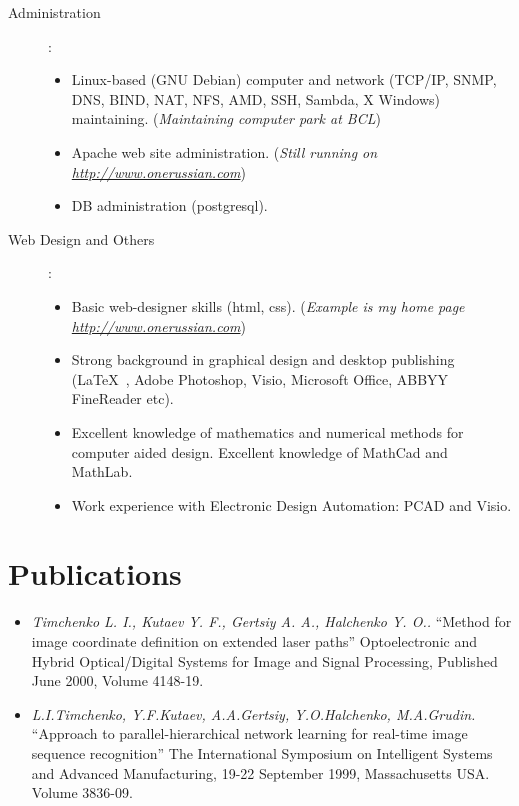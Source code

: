 \documentclass[10pt,overlapped,line]{res}
\newcommand{\wdescription}[1]{({\small \textit{#1}})}
\newcommand{\mtitle}[1]{``#1''}
\newcommand{\mauthors}[1]{ \textit{#1.}}
\newcommand{\mwhere}[1]{#1.}
\begin{document}
\begin{resume}
\begin{description}
   \item[Administration]:\\ 
     \begin{itemize}
     \item Linux-based (GNU Debian) computer and network (TCP/IP,
       SNMP, DNS, BIND, NAT, NFS, AMD, SSH, Sambda, X Windows) maintaining. 
       \wdescription{Maintaining computer park at BCL}
     \item Apache web site administration.
       \wdescription{Still running on \href{URL}{http://www.onerussian.com}}
     \item DB administration (postgresql).
     \end{itemize}

   \item[Web Design and Others]:\\
     \begin{itemize}
     \item Basic web-designer skills (html, css).
       \wdescription{Example is my home page \href{URL}{http://www.onerussian.com}}
     \item Strong background in graphical design and desktop
       publishing (\LaTeX\ , Adobe Photoshop, Visio, Microsoft Office, ABBYY
       FineReader etc).
     \item Excellent knowledge of mathematics and numerical methods
       for computer aided design. Excellent knowledge of MathCad and
       MathLab.
     \item Work experience with Electronic Design Automation: PCAD and
       Visio.
     \end{itemize}
 \end{description}

\section{Publications}

\begin{itemize}
 
 \item 
    \mauthors{Timchenko L. I., Kutaev Y. F., Gertsiy A. A., Halchenko Y. O.}
    \mtitle{Method for image coordinate definition on extended laser paths} 
    \mwhere{Optoelectronic and Hybrid Optical/Digital Systems for Image and Signal Processing, Published June 2000,  Volume 4148-19}

 \item 
    \mauthors{L.I.Timchenko, Y.F.Kutaev, A.A.Gertsiy, Y.O.Halchenko, M.A.Grudin} 
    \mtitle{Approach to parallel-hierarchical network learning for real-time image sequence recognition} 
    \mwhere{The International Symposium on Intelligent Systems and Advanced Manufacturing, 19-22 September 1999, Massachusetts USA. Volume 3836-09}


\end{itemize}
\end{resume}
\end{document}

